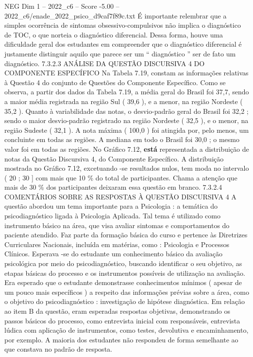 \begin{textsample}{NEG Dim 1 – 2022\_c6 – Score -5.00 – 2022\_c6/enade\_2022\_psico\_d9caf7f89c.txt}
É importante relembrar que a simples ocorrência de sintomas obsessivo-compulsivos não implica o diagnóstico de TOC, o que norteia o diagnóstico diferencial.
Dessa forma, houve uma dificuldade geral dos estudantes em compreender que o diagnóstico diferencial é justamente distinguir aquilo que parece ser um “ diagnóstico ” ser de fato um diagnóstico. 7.3.2.3 ANÁLISE DA QUESTÃO DISCURSIVA 4 DO COMPONENTE ESPECÍFICO Na Tabela 7.19, constam as informações relativas à Questão 4 do conjunto de Questões do Componente Específico.
Como se observa, a partir dos dados da Tabela 7.19, a média geral do Brasil foi 37,7, sendo a maior média registrada na região Sul ( 39,6 ), e a menor, na região Nordeste ( 35,2 ).
Quanto à variabilidade das notas, o desvio-padrão geral do Brasil foi 32,2 ; sendo o maior desvio-padrão registrado na região Nordeste ( 32,5 ), e o menor, na região Sudeste ( 32,1 ).
A nota máxima ( 100,0 ) foi atingida por, pelo menos, um concluinte em todas as regiões.
A mediana em todo o Brasil foi 30,0 ; o mesmo valor foi em todas as regiões.
No Gráfico 7.12, \textbf{está} representada a distribuição de notas da Questão Discursiva 4, do Componente Específico.
A distribuição mostrada no Gráfico 7.12, excetuando -se resultados nulos, tem moda no intervalo ( 20 ; 30 ] com mais que 10 \% do total de participantes.
Chama a atenção que mais de 30 \% dos participantes deixaram essa questão em branco. 7.3.2.4 COMENTÁRIOS SOBRE AS RESPOSTAS À QUESTÃO DISCURSIVA 4 A questão abordou um tema importante para a Psicologia : a temática do psicodiagnóstico ligada à Psicologia Aplicada.
Tal tema é utilizado como instrumento básico na área, que visa avaliar sintomas e comportamentos do paciente atendido.
Faz parte da formação básica do curso e pertence às Diretrizes Curriculares Nacionais, incluída em matérias, como : Psicologia e Processos Clínicos.
Esperava -se do estudante um conhecimento básico da avaliação psicológica por meio do psicodiagnóstico, buscando identificar o seu objetivo, as etapas básicas do processo e os instrumentos possíveis de utilização na avaliação.
Era esperado que o estudante demonstrasse conhecimentos mínimos ( apesar de um pouco mais específicos ) a respeito das informações prévias sobre a área, como o objetivo do psicodiagnóstico : investigação de hipótese diagnóstica.
Em relação ao item B da questão, eram esperadas respostas objetivas, demonstrando os passos básicos do processo, como entrevista inicial com responsáveis, entrevista lúdica com aplicação de instrumentos, como testes, devolutiva e encaminhamento, por exemplo.
A maioria dos estudantes não respondeu de forma semelhante ao que constava no padrão de resposta.

\end{textsample}
